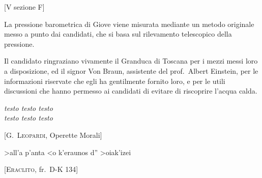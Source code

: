 \documentclass[%
    corpo=11pt,
    twoside,
    greek,
    evenboxes,
    tipotesi=secondaria,
]{toptesi}
\begin{document}


%
\begin{FrontespizioTesina}
[V sezione F]
\end{FrontespizioTesina}


\sommario

La pressione barometrica di Giove viene misurata
mediante un metodo originale  messo a punto dai candidati, che si basa
sul rilevamento telescopico della pressione.


\ringraziamenti

Il candidato ringraziano vivamente il Granduca di Toscana per i mezzi
messi loro a disposizione, ed il signor Von Braun, assistente del
prof.~Albert Einstein, per le informazioni riservate che egli ha
gentilmente fornito loro, e per le utili discussioni che hanno permesso
ai candidati di evitare di riscoprire l'acqua calda.

\tablespagetrue\figurespagetrue %
\indici

\ifclassica   
\begin{citazioni}
        \textit{testo testo testo\\testo testo testo}

        [\textsc{G.\ Leopardi}, Operette Morali]

        \textgreek{>all'a p'anta <o k'eraunos d'' >oiak'izei}

        [\textsc{Eraclito}, fr.\ D-K 134]
    \end{citazioni}

\fi
\mainmatter
\end{document}
